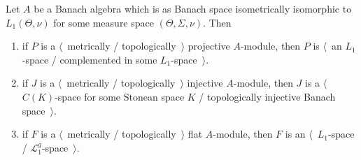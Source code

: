 \begin{proposition}\label{TopProjInjFlatModOverL1Charac} Let $A$ be a Banach
algebra which is as Banach space isometrically isomorphic to $L_1(\Theta,\nu)$
for some measure space $(\Theta,\Sigma,\nu)$. Then

\begin{enumerate}[label = (\roman*)]
    \item if $P$ is a $\langle$~metrically / topologically~$\rangle$ projective
    $A$-module, then $P$ is $\langle$~an $L_1$-space / complemented in some
    $L_1$-space~$\rangle$.

    \item if $J$ is a $\langle$~metrically / topologically~$\rangle$ injective
    $A$-module, then  $J$ is a $\langle$~$C(K)$-space for some Stonean space $K$
    / topologically injective Banach space~$\rangle$.

    \item if $F$ is a $\langle$~metrically / topologically~$\rangle$ flat
    $A$-module, then $F$ is an $\langle$~$L_1$-space /
    $\mathscr{L}_1^g$-space~$\rangle$.
\end{enumerate}
\end{proposition}
